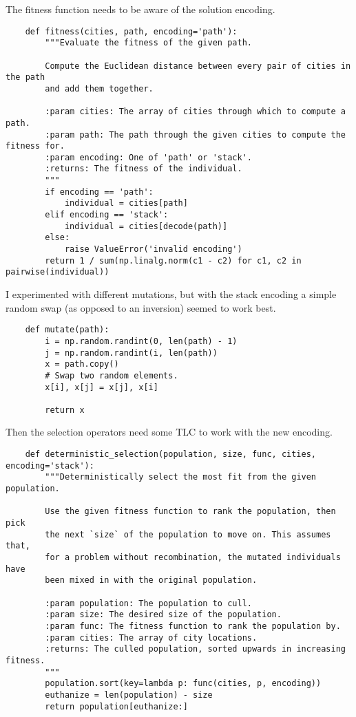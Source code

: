 \documentclass{article}
\begin{document}
The fitness function needs to be aware of the solution encoding.

\begin{verbatim}
    def fitness(cities, path, encoding='path'):
        """Evaluate the fitness of the given path.

        Compute the Euclidean distance between every pair of cities in the path
        and add them together.

        :param cities: The array of cities through which to compute a path.
        :param path: The path through the given cities to compute the fitness for.
        :param encoding: One of 'path' or 'stack'.
        :returns: The fitness of the individual.
        """
        if encoding == 'path':
            individual = cities[path]
        elif encoding == 'stack':
            individual = cities[decode(path)]
        else:
            raise ValueError('invalid encoding')
        return 1 / sum(np.linalg.norm(c1 - c2) for c1, c2 in pairwise(individual))
\end{verbatim}

I experimented with different mutations, but with the stack encoding a simple random swap (as
opposed to an inversion) seemed to work best.

\begin{verbatim}
    def mutate(path):
        i = np.random.randint(0, len(path) - 1)
        j = np.random.randint(i, len(path))
        x = path.copy()
        # Swap two random elements.
        x[i], x[j] = x[j], x[i]

        return x
\end{verbatim}

Then the selection operators need some TLC to work with the new encoding.

\begin{verbatim}
    def deterministic_selection(population, size, func, cities, encoding='stack'):
        """Deterministically select the most fit from the given population.

        Use the given fitness function to rank the population, then pick
        the next `size` of the population to move on. This assumes that,
        for a problem without recombination, the mutated individuals have
        been mixed in with the original population.

        :param population: The population to cull.
        :param size: The desired size of the population.
        :param func: The fitness function to rank the population by.
        :param cities: The array of city locations.
        :returns: The culled population, sorted upwards in increasing fitness.
        """
        population.sort(key=lambda p: func(cities, p, encoding))
        euthanize = len(population) - size
        return population[euthanize:]
\end{verbatim}
\end{document}
